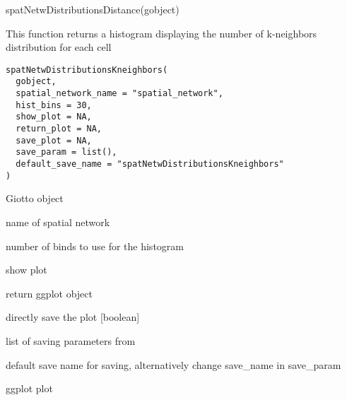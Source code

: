 \documentclass[a4paper]{book}
\begin{document}
%
\begin{Examples}
\begin{ExampleCode}
    spatNetwDistributionsDistance(gobject)
\end{ExampleCode}
\end{Examples}
%
\begin{Description}\relax
This function returns a histogram displaying the number of k-neighbors distribution for each cell
\end{Description}
%
\begin{Usage}
\begin{verbatim}
spatNetwDistributionsKneighbors(
  gobject,
  spatial_network_name = "spatial_network",
  hist_bins = 30,
  show_plot = NA,
  return_plot = NA,
  save_plot = NA,
  save_param = list(),
  default_save_name = "spatNetwDistributionsKneighbors"
)
\end{verbatim}
\end{Usage}
%
\begin{Arguments}
\begin{ldescription}
\item[\code{gobject}] Giotto object

\item[\code{spatial\_network\_name}] name of spatial network

\item[\code{hist\_bins}] number of binds to use for the histogram

\item[\code{show\_plot}] show plot

\item[\code{return\_plot}] return ggplot object

\item[\code{save\_plot}] directly save the plot [boolean]

\item[\code{save\_param}] list of saving parameters from 

\item[\code{default\_save\_name}] default save name for saving, alternatively change save\_name in save\_param
\end{ldescription}
\end{Arguments}
%
\begin{Value}
ggplot plot
\end{Value}
\end{document}
